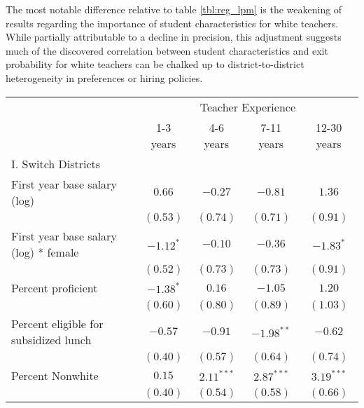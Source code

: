 The most notable difference relative to table \ref{tbl:reg_lpm} is the
weakening of results regarding the importance of student characteristics
for white teachers. While partially attributable to a decline in
precision, this adjustment suggests much of the discovered correlation
between student characteristics and exit probability for white teachers
can be chalked up to district-to-district heterogeneity in preferences
or hiring policies.

\begin{table}
\begin{center}
\begin{adjustbox}{width=\textwidth,totalheight=0.9\textheight,keepaspectratio}
\begin{tabular}{l c c c c }
\hline
 & \multicolumn{4}{c}{Teacher Experience} \\ \cline{2-5}
 & 1-3 years & 4-6 years & 7-11 years & 12-30 years \\
\hline
I. Switch Districts                             &               &               &               &              \\
\quad First year base salary (log)           & $0.66$        & $-0.27$       & $-0.81$       & $1.36$       \\
                                                & $(0.53)$      & $(0.74)$      & $(0.71)$      & $(0.91)$     \\
\quad First year base salary (log) * female  & $-1.12^{*}$   & $-0.10$       & $-0.36$       & $-1.83^{*}$  \\
                                                & $(0.52)$      & $(0.73)$      & $(0.73)$      & $(0.91)$     \\
\quad Percent proficient                     & $-1.38^{*}$   & $0.16$        & $-1.05$       & $1.20$       \\
                                                & $(0.60)$      & $(0.80)$      & $(0.89)$      & $(1.03)$     \\
\quad Percent eligible for subsidized lunch  & $-0.57$       & $-0.91$       & $-1.98^{**}$  & $-0.62$      \\
                                                & $(0.40)$      & $(0.57)$      & $(0.64)$      & $(0.74)$     \\
\quad Percent Nonwhite                       & $0.15$        & $2.11^{***}$  & $2.87^{***}$  & $3.19^{***}$ \\
                                                & $(0.40)$      & $(0.54)$      & $(0.58)$      & $(0.66)$     \\

\end{tabular}
\end{adjustbox}
\end{center}
\end{table}
